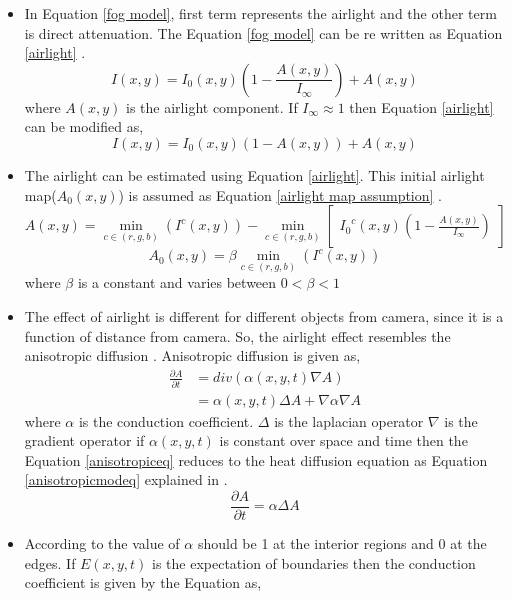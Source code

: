 \begin{itemize}
\item In Equation \ref{fog model}, first term represents the airlight and the other term is direct attenuation. The Equation \ref{fog model} can be re written as Equation \ref{airlight} \cite{fogRemoval}. 
\begin{equation}\label{airlight}
I(x,y)=I_0(x,y) (1-\frac{A(x,y)}{I_\infty})+A(x,y)
\end{equation}
where $A(x,y)$ is the airlight component. 
If $I_\infty \approx 1$ then Equation \ref{airlight} can be modified as,
\begin{equation}\label{airlightmod}
I(x,y)=I_0(x,y) (1-A(x,y))+A(x,y)
\end{equation}
\item The airlight can be estimated using Equation \ref{airlight}. This initial airlight map($A_0(x,y)$) is assumed as Equation \ref{airlight map assumption} \cite{fogRemoval}.
\begin{equation}\label{airlightest}
A(x,y) = \min_{c \in (r,g,b)} (I^c(x,y))-\min_{c \in (r,g,b)}\begin{bmatrix}
{I_0}^c(x,y)(1-\frac{A(x,y)}{I_\infty})
\end{bmatrix}
\end{equation}
\begin{equation}\label{airlight map assumption}
A_0(x,y)=\beta \min_{c\in (r,g,b)}(I^c(x,y))
\end{equation} 
where $\beta$ is a constant and varies between $0<\beta<1$
\item The effect of airlight is different for different objects from camera, since it is a function of distance from camera. So, the airlight effect resembles the anisotropic diffusion \cite{fogRemoval} \cite{anisotropic}.
Anisotropic diffusion is given as,
\begin{align}\label{anisotropiceq}
\frac{\partial A}{\partial t} &= div(\alpha(x,y,t)\nabla A)\\
& = \alpha(x,y,t)\Delta A + \nabla \alpha \nabla A
\end{align}  
where $\alpha$ is the conduction coefficient.
$\Delta$ is the laplacian operator
$\nabla$ is the gradient operator
if $\alpha(x,y,t)$ is constant over space and time then the Equation \ref{anisotropiceq} reduces to the heat diffusion equation as Equation \ref{anisotropicmodeq} explained in \cite{fogRemoval}.
\begin{equation}\label{anisotropicmodeq}
\frac{\partial A}{\partial t} = \alpha \Delta A
\end{equation}
\item According to \cite{fogRemoval} the value of $\alpha$ should be 1 at the interior regions and 0 at the edges. If $E(x,y,t)$ is the expectation of boundaries then the conduction coefficient is given by the Equation  \cite{anisotropic} as,

\end{itemize}
